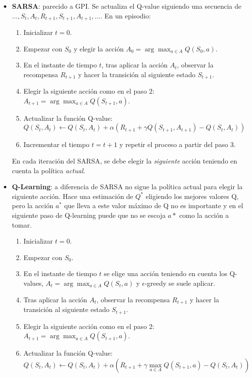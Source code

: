 \begin{itemize}
    \item \textbf{SARSA}: parecido a GPI. Se actualiza el Q-value siguiendo una secuencia de $\ldots, S_t, A_t, R_{t+1}, S_{t+1}, A_{t+1}, \ldots$. En un episodio:
    \begin{enumerate}
        \item Inicializar $t=0$.
        \item Empezar con $S_0$ y elegir la acción $A_0 = \arg \max_{a \in A} Q(S_0, a)$.
        \item En el instante de tiempo $t$, tras aplicar la acción $A_t$, observar la recompensa $R_{t+1}$ y hacer la transición al siguiente estado $S_{t+1}$.
        \item Elegir la siguiente acción como en el paso 2: $A_{t+1} = \arg \max_{a \in A} Q(S_{t+1}, a).$
        \item Actualizar la función Q-value:
        \[Q(S_t, A_t) \leftarrow Q(S_t, A_t) + \alpha(R_{t+1} + \gamma Q(S_{t+1}, A_{t+1}) - Q(S_t, A_t))\]
        \item Incrementar el tiempo $t = t + 1$ y repetir el proceso a partir del paso 3. 
    \end{enumerate}
    En cada iteración del SARSA, se debe elegir la \textit{siguiente} acción teniendo en cuenta la política \textit{actual}. 
    \item \textbf{Q-Learning}: a diferencia de SARSA no sigue la política actual para elegir la siguiente acción. Hace una estimación de $Q^*$ eligiendo los mejores valores Q, pero la acción $a^*$ que lleva a este valor máximo de Q no es importante y en el siguiente paso de Q-learning puede que no se escoja $a*$ como la acción a tomar.
    \begin{enumerate}
        \item Inicializar $t=0$.
        \item Empezar con $S_0$.
        \item En el instante de tiempo $t$ se elige una acción teniendo en cuenta los Q-values, $A_t = \arg \max_{a \in A} Q(S_t, a)$ y $\epsilon$-greedy se suele aplicar. 
        \item Tras aplicar la acción $A_t$, observar la recompensa $R_{t+1}$ y hacer la transición al siguiente estado $S_{t+1}$. 
        \item Elegir la siguiente acción como en el paso 2: $A_{t+1} = \arg \max_{a \in A} Q(S_{t+1}, a).$
        \item Actualizar la función Q-value: 
        \[Q(S_t, A_t) \leftarrow Q(S_t, A_t) + \alpha(R_{t+1} + \gamma \max_{a \in A}Q(S_{t+1},a) - Q(S_t, A_t))\]

\end{enumerate}
\end{itemize}
